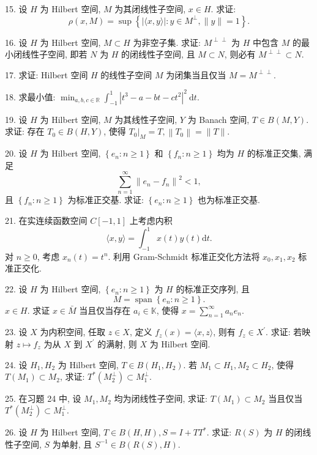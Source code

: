 \documentclass[openany]{ctexbook}
\theoremstyle{kaiti}
\theoremstyle{normal}
\begin{document}
15. 设 $H$ 为 Hilbert 空间, $M$ 为其闭线性子空间, $x \in H$. 求证:
$$
\rho(x, M)=\sup\left\{|\langle x, y\rangle|: y \in M^{\perp},\|y\|=1\right\}.
$$

16. 设 $H$ 为 Hilbert 空间, $M \subset H$ 为非空子集. 求证: $M^{\perp \perp}$ 为 $H$ 中包含 $M$ 的最小闭线性子空间, 即若 $N$ 为 $H$ 的闭线性子空间, 且 $M \subset N$, 则必有 $M^{\perp \perp} \subset N$.

17. 求证: Hilbert 空间 $H$ 的线性子空间 $M$ 为闭集当且仅当 $M=M^{\perp \perp}$.

18. 求最小值: $\min _{a, b, c \in \mathbb{R}} \int_{-1}^1\left|t^3-a-b t-c t^2\right|^2 \mathrm{~d} t$.

19. 设 $H$ 为 Hilbert 空间, $M$ 为其线性子空间, $Y$ 为 Banach 空间, $T \in B(M, Y)$. 求证: 存在 $T_0 \in B(H, Y)$, 使得 $\left.T_0\right|_{M}=T,\left\|T_0\right\|=\|T\|$.

20. 设 $H$ 为 Hilbert 空间, $\left\{e_n: n \geqslant 1\right\}$ 和 $\left\{f_n: n \geqslant 1\right\}$ 均为 $H$ 的标准正交集, 满足
$$
\sum_{n=1}^{\infty}\left\|e_n-f_n\right\|^2<1,
$$
且 $\left\{f_n: n \geqslant 1\right\}$ 为标准正交基. 求证: $\left\{e_n: n \geqslant 1\right\}$ 也为标准正交基.

21. 在实连续函数空间 $C[-1,1]$ 上考虑内积
$$
\langle x, y\rangle=\int_{-1}^1 x(t) y(t) \mathrm{d} t.
$$
对 $n \geqslant 0$, 考虑 $x_n(t)=t^n$. 利用 Gram-Schmidt 标准正交化方法将 $x_0, x_1, x_2$ 标准正交化.

22. 设 $H$ 为 Hilbert 空间, $\left\{e_n: n \geqslant 1\right\}$ 为 $H$ 的标准正交序列, 且
$$
M=\operatorname{span}\left\{e_n: n \geqslant 1\right\}.
$$
$x \in H$. 求证 $x \in \bar{M}$ 当且仅当存在 $a_{i} \in \mathbb{K}$, 使得 $x=\sum_{n=1}^{\infty} a_n e_n$.

23. 设 $X$ 为内积空间, 任取 $z \in X$, 定义 $f_{z}(x)=\langle x, z\rangle$, 则有 $f_{z} \in X^{\prime}$. 求证: 若映射 $z \mapsto f_{z}$ 为从 $X$ 到 $X^{\prime}$ 的满射, 则 $X$ 为 Hilbert 空间.

24. 设 $H_1, H_2$ 为 Hilbert 空间, $T \in B\left(H_1, H_2\right)$. 若 $M_1 \subset H_1, M_2 \subset H_2$, 使得 $T\left(M_1\right) \subset M_2$, 求证: $T^{*}\left(M_2^{\perp}\right) \subset M_1^{\perp}$.

25. 在习题 24 中, 设 $M_1, M_2$ 均为闭线性子空间, 求证: $T\left(M_1\right) \subset M_2$ 当且仅当 $T^{*}\left(M_2^{\perp}\right) \subset M_1^{\perp}.$

26. 设 $H$ 为 Hilbert 空间, $T \in B(H, H), S=I+T T^{*}$. 求证: $R(S)$ 为 $H$ 的闭线性子空间, $S$ 为单射, 且 $S^{-1} \in B(R(S), H)$.
\end{document}
